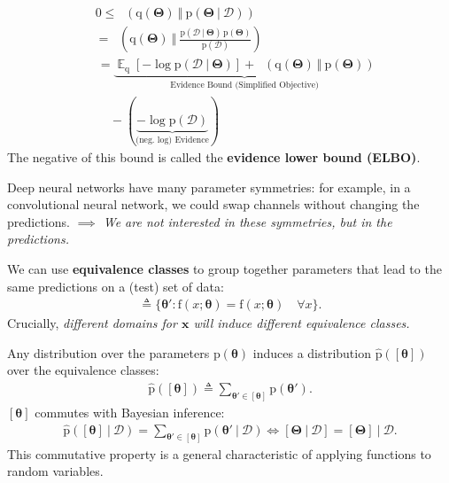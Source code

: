 \documentclass[25pt,a0paper,landscape]{tikzposter}
\DeclareMathOperator{\opExpectation}{\mathbb{E}}
\newcommand{\E}[2]{\opExpectation_{#1} \left [ #2 \right ]}
\newcommand{\MidSymbol}[1][]{\:#1\:}
\newcommand{\given}{\MidSymbol[\vert]}
\DeclareMathOperator{\opKale}{D_\mathrm{KL}}
\newcommand{\Kale}[2]{\opKale(#1 \MidSymbol[\Vert] #2)}
\newcommand{\opp}{\mathrm{p}}
\newcommand{\pof}[1]{\opp(#1)}
\newcommand{\hpof}[1]{\hat{\opp}(#1)}
\newcommand{\opq}{\mathrm{q}}
\newcommand{\qof}[1]{\opq(#1)}
\newcommand{\w}{\boldsymbol{\theta}}
\newcommand{\W}{\boldsymbol{\Theta}}
\newcommand{\opf}{\mathrm{f}}
\newcommand{\fof}[1]{\opf(#1)}
\newcommand{\Dany}{\mathcal{D}}
\newcommand{\x}{\boldsymbol{x}}
\begin{document}
\begin{columns}
{\begin{multicols}{2}
\begin{backgroundbox}[title=(Regular) Variational Inference \& ELBO]
      \begin{align*}
      & 0 \le \Kale{\qof{\W}}{\pof{\W \given \Dany}} \\
      &= \Kale{\qof{\W}}{\frac{\pof{\Dany \given \W}\,\pof{\W}}{\pof{\Dany}}}\\
      &\, = \underbrace{\E{\opq}{-\log \pof{\Dany \given \W}} + \Kale{\qof{\W}}{\pof{\W}}}_{\text{Evidence Bound (Simplified Objective)}} \\
      &\, \quad - (\underbrace{-\log \pof{\Dany}}_{\text{(neg.~log) Evidence}})
      \end{align*}
      The negative of this bound is called the \textbf{evidence lower bound (ELBO)}.
    \end{backgroundbox}
    \begin{theorybox}[title=Parameter Symmetries]
      Deep neural networks have many parameter symmetries: for example, in a convolutional neural network, we could swap channels without changing the predictions.
      \emph{$\implies$ We are not interested in these symmetries, but in the predictions.}
    \end{theorybox}
    \begin{theorybox}[title=Equivalence Classes]
      We can use \textbf{equivalence classes} to group together parameters that lead to the same predictions on a (test) set of data:
      \begin{align*}
        [\w] \triangleq \{\w' : \fof{x ; \w} = \fof{x ; \w} \quad \forall x \}.
      \end{align*}
      Crucially, \emph{different domains for $\x$ will induce different equivalence classes.}
    \end{theorybox}
    \begin{theorybox}[title=Consistency of Equivalence Classes with Bayesian Inference]
      Any distribution over the parameters $\pof{\w}$ induces a distribution $\hpof{[\w]}$ over the equivalence classes:
      \begin{align*}
        \hpof{[\w]} \triangleq \sum_{\w' \in [\w]} \pof{\w'}.
      \end{align*}
      $[\w]$ commutes with Bayesian inference:
      \begin{align*}
        \hpof{[\w] \given \Dany} = \sum_{\w' \in [\w]} \pof{\w' \given \Dany}
        \Leftrightarrow [\W \given \Dany] = [\W] \given \Dany.
      \end{align*}
      This commutative property is a general characteristic of applying functions to random variables. 

\end{theorybox}
\end{multicols}}
\end{columns}
\end{document}
